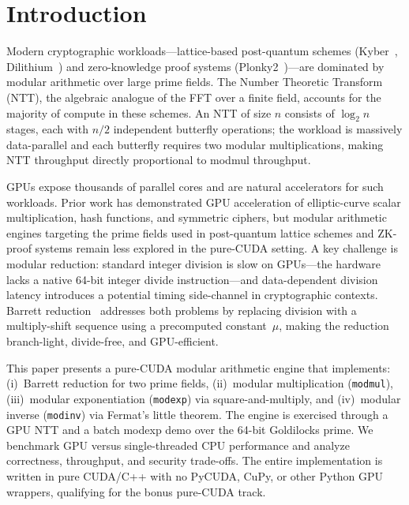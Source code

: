 \documentclass[conference]{IEEEtran}
\begin{document}
\section{Introduction}

Modern cryptographic workloads---lattice-based post-quantum schemes
(Kyber~\cite{kyber}, Dilithium~\cite{dilithium}) and zero-knowledge proof
systems (Plonky2~\cite{plonky2})---are dominated by modular arithmetic over
large prime fields. The Number Theoretic Transform (NTT), the algebraic analogue
of the FFT over a finite field, accounts for the majority of compute in these
schemes. An NTT of size $n$ consists of $\log_2 n$ stages, each with $n/2$
independent butterfly operations; the workload is massively data-parallel and
each butterfly requires two modular multiplications, making NTT throughput
directly proportional to modmul throughput.

GPUs expose thousands of parallel cores and are natural accelerators for such
workloads. Prior work has demonstrated GPU acceleration of elliptic-curve scalar
multiplication, hash functions, and symmetric ciphers, but modular arithmetic
engines targeting the prime fields used in post-quantum lattice schemes and
ZK-proof systems remain less explored in the pure-CUDA setting. A key challenge
is modular reduction: standard integer division is slow on GPUs---the hardware
lacks a native 64-bit integer divide instruction---and data-dependent division
latency introduces a potential timing side-channel in cryptographic contexts.
Barrett reduction~\cite{barrett} addresses both problems by replacing division
with a multiply-shift sequence using a precomputed constant~$\mu$, making the
reduction branch-light, divide-free, and GPU-efficient.

This paper presents a pure-CUDA modular arithmetic engine that implements:
(i)~Barrett reduction for two prime fields,
(ii)~modular multiplication (\texttt{modmul}),
(iii)~modular exponentiation (\texttt{modexp}) via square-and-multiply, and
(iv)~modular inverse (\texttt{modinv}) via Fermat's little theorem.
The engine is exercised through a GPU NTT and a batch modexp demo over the
64-bit Goldilocks prime. We benchmark GPU versus single-threaded CPU performance
and analyze correctness, throughput, and security trade-offs.
The entire implementation is written in pure CUDA/C++ with no PyCUDA, CuPy, or
other Python GPU wrappers, qualifying for the bonus pure-CUDA track.
\end{document}
